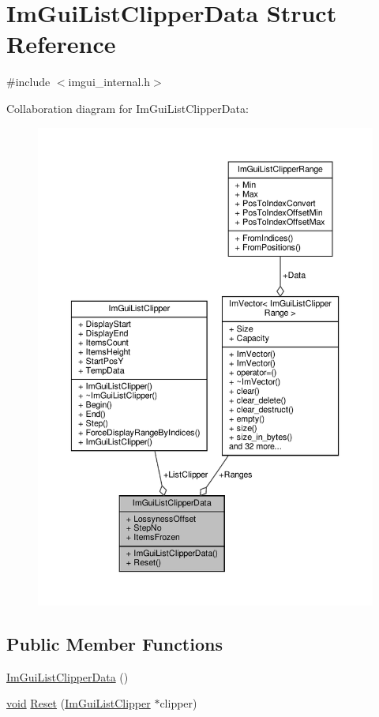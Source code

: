 \hypertarget{structImGuiListClipperData}{}\section{Im\+Gui\+List\+Clipper\+Data Struct Reference}
\label{structImGuiListClipperData}


{\ttfamily \#include $<$imgui\+\_\+internal.\+h$>$}



Collaboration diagram for Im\+Gui\+List\+Clipper\+Data\+:
\nopagebreak
\begin{figure}[H]
\begin{center}
\leavevmode
\includegraphics[width=350pt]{structImGuiListClipperData__coll__graph}
\end{center}
\end{figure}
\subsection*{Public Member Functions}
\begin{DoxyCompactItemize}
\item 
\hyperlink{structImGuiListClipperData_a05ce3a593cc4a9530fce8c89804cee5d}{Im\+Gui\+List\+Clipper\+Data} ()
\item 
\hyperlink{imgui__impl__opengl3__loader_8h_ac668e7cffd9e2e9cfee428b9b2f34fa7}{void} \hyperlink{structImGuiListClipperData_a2fd1f3adb3fda313acddc1203fec0d1c}{Reset} (\hyperlink{structImGuiListClipper}{Im\+Gui\+List\+Clipper} $\ast$clipper)
\end{DoxyCompactItemize}

